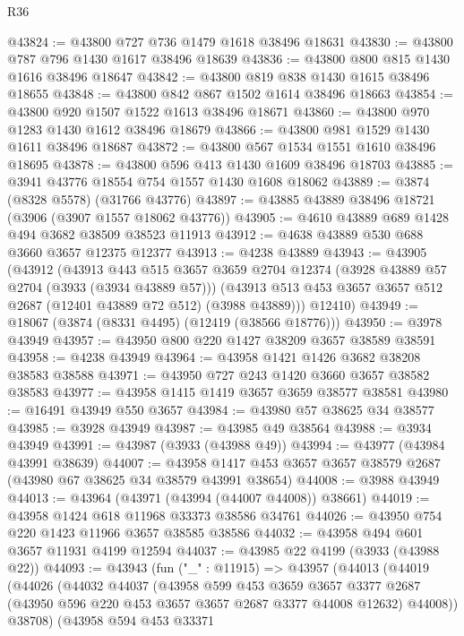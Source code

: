 \begin{lexlean}{R36}
\begin{coremodule}
@43824 := @43800 @727 @736 @1479 @1618 @38496 @18631
@43830 := @43800 @787 @796 @1430 @1617 @38496 @18639
@43836 := @43800 @800 @815 @1430 @1616 @38496 @18647
@43842 := @43800 @819 @838 @1430 @1615 @38496 @18655
@43848 := @43800 @842 @867 @1502 @1614 @38496 @18663
@43854 := @43800 @920 @1507 @1522 @1613 @38496 @18671
@43860 := @43800 @970 @1283 @1430 @1612 @38496 @18679
@43866 := @43800 @981 @1529 @1430 @1611 @38496 @18687
@43872 := @43800 @567 @1534 @1551 @1610 @38496 @18695
@43878 := @43800 @596 @413 @1430 @1609 @38496 @18703
@43885 := @3941 @43776 @18554 @754 @1557 @1430 @1608 @18062
@43889 := @3874 (@8328 @5578) (@31766 @43776)
@43897 := @43885 @43889 @38496 @18721 (@3906 (@3907 @1557 @18062 @43776))
@43905 := @4610 @43889 @689 @1428 @494 @3682 @38509 @38523 @11913
@43912 := @4638 @43889 @530 @688 @3660 @3657 @12375 @12377
@43913 := @4238 @43889
@43943 := @43905
    (@43912
      (@43913
        @443
        @515
        @3657
        @3659
        @2704
        @12374
        (@3928 @43889 @57 @2704 (@3933 (@3934 @43889 @57)))
        (@43913 @513 @453 @3657 @3657 @512 @2687 (@12401 @43889 @72 @512) (@3988 @43889)))
      @12410)
@43949 := @18067 (@3874 (@8331 @4495) (@12419 (@38566 @18776)))
@43950 := @3978 @43949
@43957 := @43950 @800 @220 @1427 @38209 @3657 @38589 @38591
@43958 := @4238 @43949
@43964 := @43958 @1421 @1426 @3682 @38208 @38583 @38588
@43971 := @43950 @727 @243 @1420 @3660 @3657 @38582 @38583
@43977 := @43958 @1415 @1419 @3657 @3659 @38577 @38581
@43980 := @16491 @43949 @550 @3657
@43984 := @43980 @57 @38625 @34 @38577
@43985 := @3928 @43949
@43987 := @43985 @49 @38564
@43988 := @3934 @43949
@43991 := @43987 (@3933 (@43988 @49))
@43994 := @43977 (@43984 @43991 @38639)
@44007 := @43958 @1417 @453 @3657 @3657 @38579 @2687 (@43980 @67 @38625 @34 @38579 @43991 @38654)
@44008 := @3988 @43949
@44013 := @43964 (@43971 (@43994 (@44007 @44008)) @38661)
@44019 := @43958 @1424 @618 @11968 @33373 @38586 @34761
@44026 := @43950 @754 @220 @1423 @11966 @3657 @38585 @38586
@44032 := @43958 @494 @601 @3657 @11931 @4199 @12594
@44037 := @43985 @22 @4199 (@3933 (@43988 @22))
@44093 := @43943
    (fun ("_" : @11915) =>
    @43957
      (@44013
        (@44019
          (@44026
            (@44032
              @44037
              (@43958
                @599
                @453
                @3659
                @3657
                @3377
                @2687
                (@43950 @596 @220 @453 @3657 @3657 @2687 @3377 @44008 @12632)
                @44008))
            @38708)
          (@43958
            @594
            @453
            @33371

\end{coremodule}
\end{lexlean}
